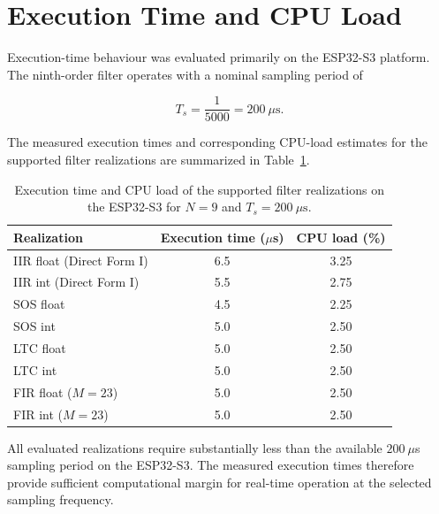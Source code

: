 
\section{Execution Time and CPU Load}
\label{sec:execution_time}

Execution-time behaviour was evaluated primarily on the ESP32-S3 platform. The
ninth-order filter operates with a nominal sampling period of

\begin{equation}
    T_s = \frac{1}{5000}
    = 200~\mu\mathrm{s}.
\end{equation}

The measured execution times and corresponding CPU-load estimates for the
supported filter realizations are summarized in
Table~\ref{tab:esp32_execution}.

\begin{table}[H]
    \centering
    \caption{Execution time and CPU load of the supported filter
        realizations on the ESP32-S3 for $N=9$ and
        $T_s=200~\mu\mathrm{s}$.}
    \label{tab:esp32_execution}
    \begin{tabular}{lcc}
        \toprule
        \textbf{Realization}             &
        \textbf{Execution time ($\mu$s)} &
        \textbf{CPU load (\%)}                        \\
        \midrule
        IIR float (Direct Form I)        & 6.5 & 3.25 \\
        IIR int (Direct Form I)          & 5.5 & 2.75 \\
        SOS float                        & 4.5 & 2.25 \\
        SOS int                          & 5.0 & 2.50 \\
        LTC float                        & 5.0 & 2.50 \\
        LTC int                          & 5.0 & 2.50 \\
        FIR float ($M=23$)               & 5.0 & 2.50 \\
        FIR int ($M=23$)                 & 5.0 & 2.50 \\
        \bottomrule
    \end{tabular}
\end{table}

All evaluated realizations require substantially less than the available
$200~\mu$s sampling period on the ESP32-S3. The measured execution times
therefore provide sufficient computational margin for real-time operation at
the selected sampling frequency.

